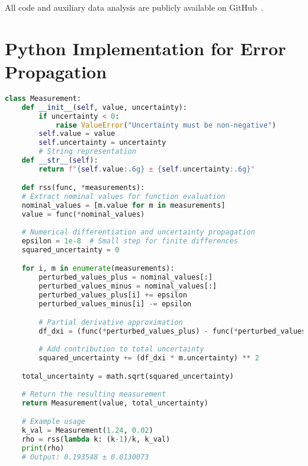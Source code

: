 All code and auxiliary data analysis are publicly available on GitHub~\parencite{PagliucaGithub}.

\appendix
\section{Python Implementation for Error Propagation} \label{appendix:python_code}

\begin{lstlisting}[language=Python]
    class Measurement:
    def __init__(self, value, uncertainty):
        if uncertainty < 0:
            raise ValueError("Uncertainty must be non-negative")
        self.value = value
        self.uncertainty = uncertainty
        # String representation
    def __str__(self):
        return f"{self.value:.6g} ± {self.uncertainty:.6g}"

    def rss(func, *measurements):
    # Extract nominal values for function evaluation
    nominal_values = [m.value for m in measurements]
    value = func(*nominal_values)
    
    # Numerical differentiation and uncertainty propagation
    epsilon = 1e-8  # Small step for finite differences
    squared_uncertainty = 0

    for i, m in enumerate(measurements):
        perturbed_values_plus = nominal_values[:]
        perturbed_values_minus = nominal_values[:]
        perturbed_values_plus[i] += epsilon
        perturbed_values_minus[i] -= epsilon

        # Partial derivative approximation
        df_dxi = (func(*perturbed_values_plus) - func(*perturbed_values_minus)) / (2 * epsilon)
        
        # Add contribution to total uncertainty
        squared_uncertainty += (df_dxi * m.uncertainty) ** 2

    total_uncertainty = math.sqrt(squared_uncertainty)
    
    # Return the resulting measurement
    return Measurement(value, total_uncertainty)

    # Example usage
    k_val = Measurement(1.24, 0.02)
    rho = rss(lambda k: (k-1)/k, k_val)
    print(rho) 
    # Output: 0.193548 ± 0.0130073

\end{lstlisting}
